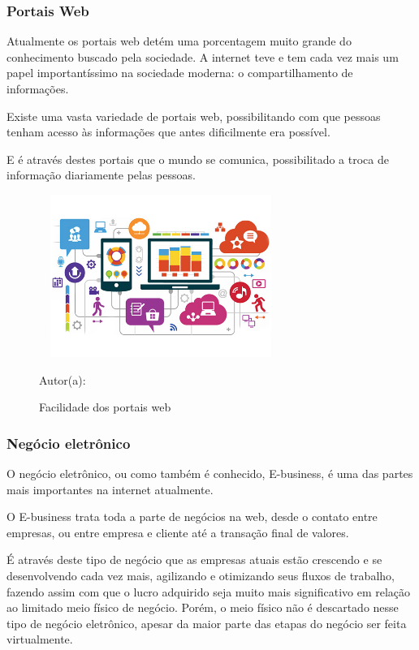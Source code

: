 \subsubsection{Portais Web}

Atualmente os portais web detém uma porcentagem muito grande do conhecimento buscado pela sociedade. A internet teve e tem cada vez mais um papel importantíssimo na sociedade moderna: o compartilhamento de informações.

Existe uma vasta variedade de portais web, possibilitando com que pessoas tenham acesso às informações que antes dificilmente era possível.

E é através destes portais que o mundo se comunica, possibilitado a troca de informação diariamente pelas pessoas.
\newpage
 \begin{figure}[!h]
	\centering
	\caption{Facilidade dos portais web}
	\includegraphics[width=300px, height=200px]{./images/2-5.png}
	\par{Autor(a): \cite{newtechs}}
\end{figure}

\subsubsection{Negócio eletrônico}

O negócio eletrônico, ou como também é conhecido, E-business, é uma das partes mais importantes na internet atualmente.

O E-business trata toda a parte de negócios na web, desde o contato entre empresas, ou entre empresa e cliente até a transação final de valores.

É através deste tipo de negócio que as empresas atuais estão crescendo e se desenvolvendo cada vez mais, agilizando e otimizando seus fluxos de trabalho, fazendo assim com que o lucro adquirido seja muito mais significativo em relação ao limitado meio físico de negócio. Porém, o meio físico não é descartado nesse tipo de negócio eletrônico, apesar da maior parte das etapas do negócio ser feita virtualmente.

